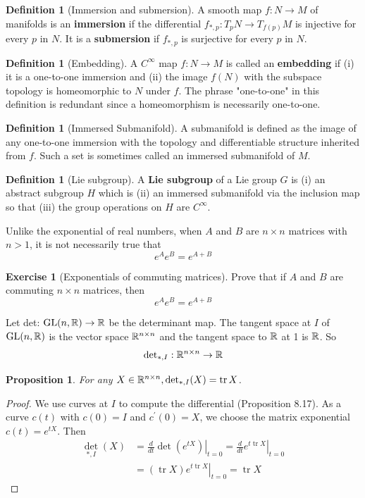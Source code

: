 \documentclass{amsart}
\let\originalmathbb\mathbb
\renewcommand{\mathbb}[1]{%
    \ifstrequal{#1}{1}{\mathbbm{#1}}{\originalmathbb{#1}}%
}
\theoremstyle{plain}
\newtheorem{proposition}[theorem]{Proposition}
\theoremstyle{definition}
\newtheorem{definition}[theorem]{Definition}
\newtheorem{exercise}[theorem]{Exercise}
\theoremstyle{remark}
\begin{document}
\begin{definition}[Immersion and submersion]
A smooth map $f: N \rightarrow M$ of manifolds is an \textbf{immersion} if the differential $f_{*, p}: T_p N \rightarrow T_{f(p)} M$ is injective for every $p$ in $N$. It is a \textbf{submersion} if $f_{*, p}$ is surjective for every $p$ in $N$.
\end{definition}
\begin{definition}[Embedding]
A $C^{\infty}$ map $f: N \rightarrow M$ is called an \textbf{embedding} if (i) it is a one-to-one immersion and (ii) the image $f(N)$ with the subspace topology is homeomorphic to $N$ under $f$. The phrase "one-to-one" in this definition is redundant since a homeomorphism is necessarily one-to-one.
\end{definition}
\begin{definition}[Immersed Submanifold]
A submanifold is defined as the image of any one-to-one immersion with the topology and differentiable structure inherited from $f$. Such a set is sometimes called an immersed submanifold of $M$.
\end{definition}
\begin{definition}[Lie subgroup]
A \textbf{Lie subgroup} of a Lie group $G$ is (i) an abstract subgroup $H$ which is (ii) an immersed submanifold via the inclusion map so that (iii) the group operations on $H$ are $C^{\infty}$.
\end{definition}
Unlike the exponential of real numbers, when $A$ and $B$ are $n \times n$ matrices with $n>1$, it is not necessarily true that
\[
e^A e^B=e^{A+B}
\]
\begin{exercise}[Exponentials of commuting matrices]
Prove that if $A$ and $B$ are commuting $n \times n$ matrices, then
\[
e^A e^B=e^{A+B}
\]
\end{exercise}
Let det: $\mathrm{GL}(n, \mathbb{R}) \rightarrow \mathbb{R}$ be the determinant map. The tangent space at $I$ of $\mathrm{GL}(n, \mathbb{R})$ is the vector space $\mathbb{R}^{n \times n}$ and the tangent space to $\mathbb{R}$ at 1 is $\mathbb{R}$. So
\[
\operatorname{det}_{*, I}: \mathbb{R}^{n \times n} \rightarrow \mathbb{R}
\]
\begin{proposition}
For any $X \in \mathbb{R}^{n \times n}, \operatorname{det}_{*, I}(X)=\operatorname{tr} X$.
\end{proposition}
\begin{proof}
We use curves at $I$ to compute the differential (Proposition 8.17). As a curve $c(t)$ with $c(0)=I$ and $c^{\prime}(0)=X$, we choose the matrix exponential $c(t)=e^{t X}$. Then
\[
\begin{aligned}
\operatorname{det}_{*, I}(X) & =\left.\frac{d}{d t} \operatorname{det}\left(e^{t X}\right)\right|_{t=0}=\left.\frac{d}{d t} e^{t \operatorname{tr} X}\right|_{t=0} \\
& =\left.(\operatorname{tr} X) e^{t \operatorname{tr} X}\right|_{t=0}=\operatorname{tr} X
\end{aligned}
\]
\end{proof}
\end{document}
